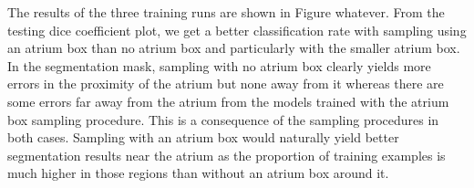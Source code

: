 \noindent The results of the three training runs are shown in Figure whatever. From the testing dice coefficient plot, we get a better classification rate with sampling using an atrium box than no atrium box and particularly with the smaller atrium box. In the segmentation mask, sampling with no atrium box clearly yields more errors in the proximity of the atrium but none away from it whereas there are some errors far away from the atrium from the models trained with the atrium box sampling procedure. This is a consequence of the sampling procedures in both cases. Sampling with an atrium box would naturally yield better segmentation results near the atrium as the proportion of training examples is much higher in those regions than without an atrium box around it.\\




